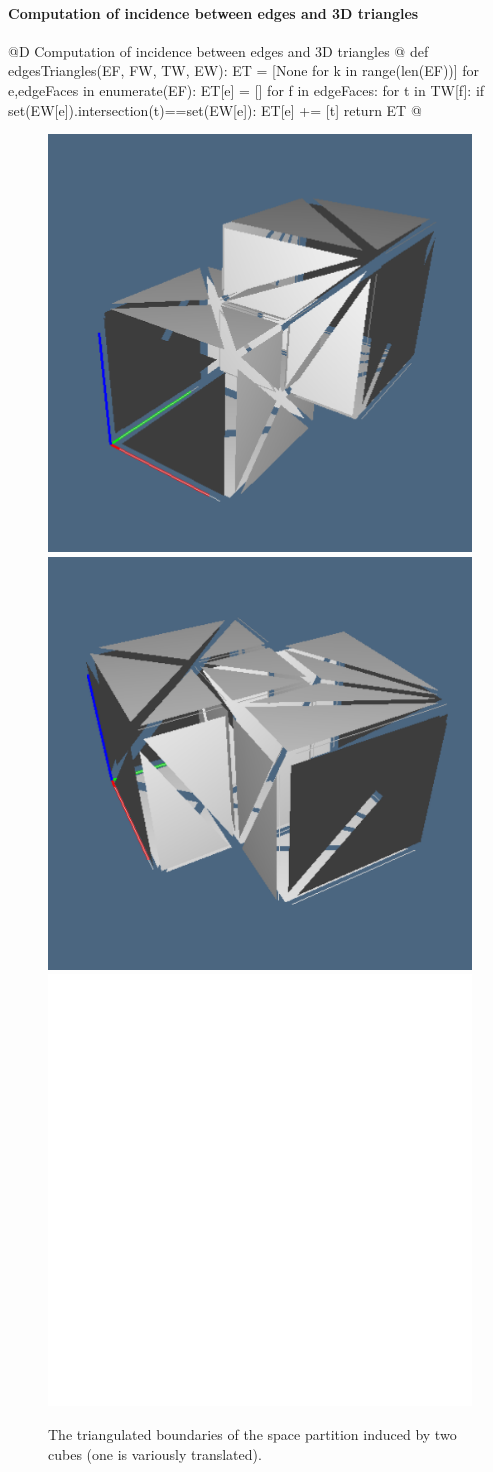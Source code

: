 \documentclass[11pt,oneside]{article}    %
\begin{document}
\paragraph{Computation of incidence between edges and 3D triangles}
@D Computation of incidence between edges and 3D triangles @{
def edgesTriangles(EF, FW, TW, EW):
    ET = [None for k in range(len(EF))]
    for e,edgeFaces in enumerate(EF):
        ET[e] = []
        for f in edgeFaces:
            for t in TW[f]:
                if set(EW[e]).intersection(t)==set(EW[e]):
                    ET[e] += [t]
    return ET
@}

\begin{figure}[htbp] %
   \centering
   \includegraphics[height=0.325\linewidth,width=0.325\linewidth]{images/3Dtriangulation} 
   \includegraphics[height=0.325\linewidth,width=0.325\linewidth]{images/3Dtriangulation2} 
   \includegraphics[height=0.325\linewidth,width=0.325\linewidth]{images/3Dtriangulation3} 
   \caption{The triangulated boundaries of the space partition induced by two cubes (one is variously translated).}
   \label{fig:3Dtriangulation}
\end{figure}
\end{document}
